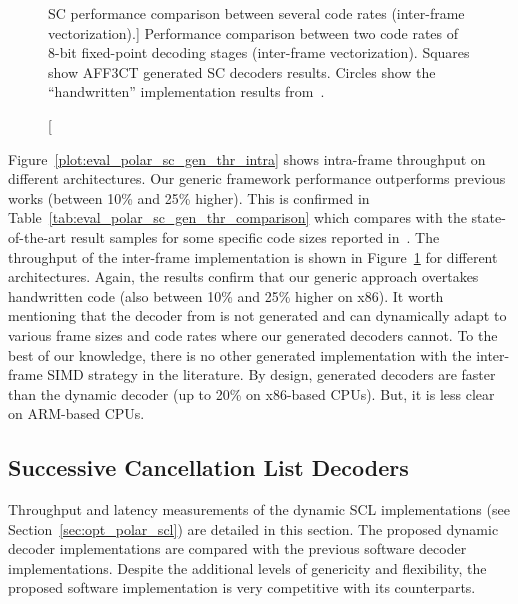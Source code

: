 \begin{figure}[htp]
  \centering
  \quad
  \caption
    [SC performance comparison between several code rates (inter-frame
     vectorization).]
    {Performance comparison between two code rates of 8-bit fixed-point decoding
     stages (inter-frame vectorization). Squares show AFF3CT generated SC
     decoders results. Circles show the ``handwritten'' implementation results
     from~\cite{LeGal2015a}.}
  \label{plot:eval_polar_sc_gen_thr_inter}
\end{figure}

Figure~\ref{plot:eval_polar_sc_gen_thr_intra} shows \AFFECT intra-frame
throughput on different architectures. Our generic framework performance
outperforms previous works (between 10\% and 25\% higher). This is confirmed in
Table~\ref{tab:eval_polar_sc_gen_thr_comparison} which compares \AFFECT with the
state-of-the-art result samples for some specific code sizes reported
in~\cite{Sarkis2014}. The throughput of the inter-frame implementation is shown
in Figure~\ref{plot:eval_polar_sc_gen_thr_inter} for different architectures.
Again, the results confirm that our generic approach overtakes handwritten code
(also between 10\% and 25\% higher on x86). It worth mentioning that the decoder
from \cite{LeGal2015a} is not generated and can dynamically adapt to various
frame sizes and code rates where our generated decoders cannot. To the best of
our knowledge, there is no other generated implementation with the inter-frame
SIMD strategy in the literature. By design, generated decoders are faster than
the dynamic decoder (up to 20\% on x86-based CPUs). But, it is less clear on
ARM\R-based CPUs.

\subsection{Successive Cancellation List Decoders}

Throughput and latency measurements of the dynamic SCL implementations (see
Section~\ref{sec:opt_polar_scl}) are detailed in this section. The proposed
dynamic decoder implementations are compared with the previous software
decoder implementations. Despite the additional levels of genericity and
flexibility, the proposed software implementation is very competitive with its
counterparts.

